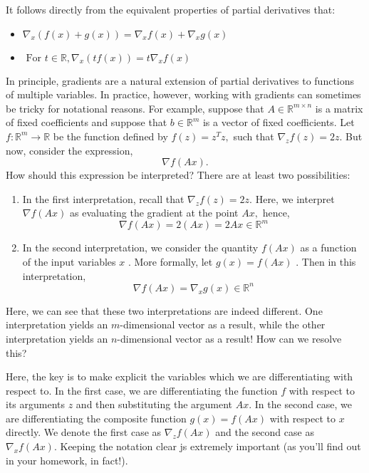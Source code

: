 \documentclass[10pt,a4paper,oneside]{article}
\begin{document}
It follows directly from the equivalent properties of partial derivatives that:
\begin{itemize}
\item $\nabla_{x}(f(x)+g(x))=\nabla_{x} f(x)+\nabla_{x} g(x)$
\item $\text { For } t \in \mathbb{R}, \nabla_{x}(t f(x))=t \nabla_{x} f(x)$
\end{itemize}

In principle, gradients are a natural extension of partial derivatives to functions of multiple variables. In practice, however, working with gradients can sometimes be tricky for notational reasons. For example, suppose that \(A \in \mathbb{R}^{m \times n}\) is a matrix of fixed coefficients and suppose that \(b \in \mathbb{R}^{m}\) is a vector of fixed coefficients. Let \(f : \mathbb{R}^{m} \rightarrow \mathbb{R}\) be the function defined by \(f(z)=z^{T} z,\) such that \(\nabla_{z} f(z)=2 z .\) But now, consider the expression,
\[
\nabla f(A x).
\]
How should this expression be interpreted? There are at least two possibilities:
\begin{enumerate}[1.]
\item In the first interpretation, recall that \(\nabla_{z} f(z)=2 z\). Here, we interpret \(\nabla f(A x)\) as evaluating the gradient at the point \(A x,\) hence,
\[
\nabla f(A x)=2(A x)=2 A x \in \mathbb{R}^{m}
\]
\item In the second interpretation, we consider the quantity \(f(A x)\) as a function of the input
variables \(x\) . More formally, let \(g(x)=f(A x)\) . Then in this interpretation,
\[
\nabla f(A x)=\nabla_{x} g(x) \in \mathbb{R}^{n}
\]
\end{enumerate}
Here, we can see that these two interpretations are indeed different. One interpretation yields an \(m\)-dimensional vector as a result, while the other interpretation yields an \(n\)-dimensional vector as a result! How can we resolve this?

Here, the key is to make explicit the variables which we are differentiating with respect to. In the first case, we are differentiating the function \(f\) with respect to its arguments \(z\) and then substituting the argument \(A x .\) In the second case, we are differentiating the composite function \(g(x)=f(A x)\) with respect to \(x\) directly. We denote the first case as \(\nabla_{z} f(A x)\) and the second case as \(\nabla_{x} f(A x) .\) Keeping the notation clear js extremely important (as you'll find out in your homework, in fact!).
\end{document}
